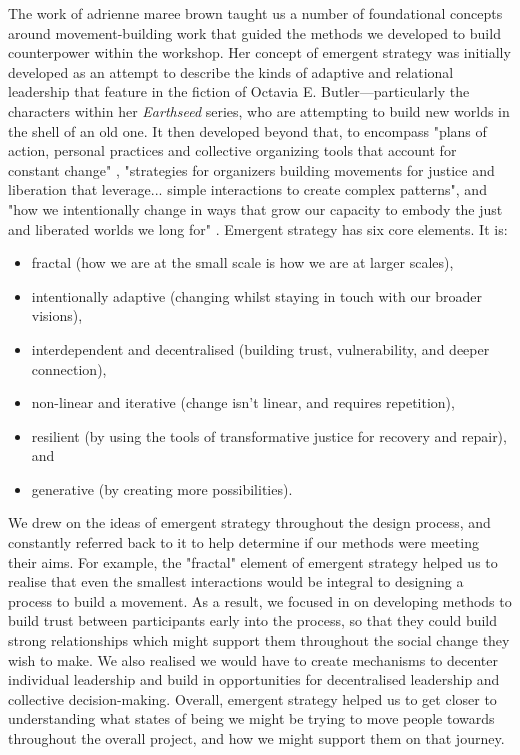The work of adrienne maree brown taught us a number of foundational concepts around movement-building work that guided the methods we developed to build counterpower within the workshop. Her concept of emergent strategy was initially developed as an attempt to describe the kinds of adaptive and relational leadership that feature in the fiction of Octavia E. Butler—particularly the characters within her \emph{Earthseed} series, who are attempting to build new worlds in the shell of an old one. It then developed beyond that, to encompass "plans of action, personal practices and collective organizing tools that account for constant change" \citep[p. 23]{brown_emergent_2017}, "strategies for organizers building movements for justice and liberation that leverage... simple interactions to create complex patterns", and "how we intentionally change in ways that grow our capacity to embody the just and liberated worlds we long for" \citep[p. 24]{brown_emergent_2017}. Emergent strategy has six core elements. It is:
\begin{itemize}
    \item fractal (how we are at the small scale is how we are at larger scales),
    \item intentionally adaptive (changing whilst staying in touch with our broader visions),
    \item interdependent and decentralised (building trust, vulnerability, and deeper connection),
    \item non-linear and iterative (change isn't linear, and requires repetition),
    \item resilient (by using the tools of transformative justice for recovery and repair), and
    \item generative (by creating more possibilities). \cite[p. 50]{brown_emergent_2017}
\end{itemize}
We drew on the ideas of emergent strategy throughout the design process, and constantly referred back to it to help determine if our methods were meeting their aims. For example, the "fractal" element of emergent strategy helped us to realise that even the smallest interactions would be integral to designing a process to build a movement. As a result, we focused in on developing methods to build trust between participants early into the process, so that they could build strong relationships which might support them throughout the social change they wish to make. We also realised we would have to create mechanisms to decenter individual leadership and build in opportunities for decentralised leadership and collective decision-making. Overall, emergent strategy helped us to get closer to understanding what states of being we might be trying to move people towards throughout the overall project, and how we might support them on that journey.

